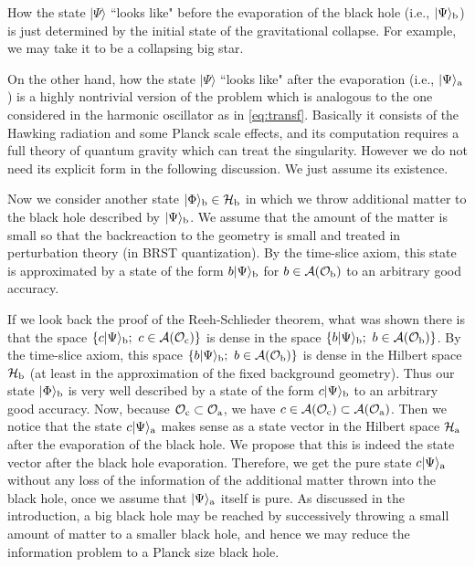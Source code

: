 \documentclass[a4paper,11pt]{article}
\theoremstyle{plain}
\theoremstyle{definition}
\numberwithin{thm}{section}
\newcommand{\ket}[1]{ | {#1} \rangle }
\def\CA{{\cal A}}
\def\CH{{\cal H}}
\def\CO{{\cal O}}
\begin{document}
How the state $\ket{\Psi}$ ``looks like" before the evaporation of the black hole (i.e., $\ket{\Psi}_{\rm b}$) is just determined by the initial state of the gravitational collapse. For example, 
we may take it to be a collapsing big star.

On the other hand, how the state $\ket{\Psi}$ ``looks like" after the evaporation (i.e., $\ket{\Psi}_{\rm a}$) is a highly nontrivial version of the problem which is
analogous to the one considered in the harmonic oscillator 
as in \eqref{eq:transf}. Basically it consists of the Hawking radiation and some Planck scale effects, and its computation requires a full theory of quantum gravity which can treat the singularity.
However we do not need its explicit form in the following discussion. We just assume its existence. 


Now we consider another state $\ket{\Phi}_{\rm b} \in \CH_{\rm b}$ in which we throw additional matter to the black hole described by $\ket{\Psi}_{\rm b}$.
We assume that the amount of the matter is small so that the backreaction to the geometry is small and treated in perturbation theory (in BRST quantization).
By the time-slice axiom, this state is approximated by a state of the form  $ b\ket{\Psi}_{\rm b}$ for $b \in \CA(\CO_{\rm b})$ to an arbitrary good accuracy. 

If we look back the proof of the Reeh-Schlieder theorem, what was shown there is that
the space $\{  c\ket{\Psi}_{\rm b};\  c \in \CA(\CO_{\rm c}) \}$ is dense in the space $\{  b\ket{\Psi}_{\rm b};\ b \in \CA(\CO_{\rm b}) \}$.
By the time-slice axiom, this space $\{  b\ket{\Psi}_{\rm b};\ b \in \CA(\CO_{\rm b}) \}$ is dense in the Hilbert space $\CH_{\rm b}$
(at least in the approximation of the fixed background geometry).
Thus our state $\ket{\Phi}_{\rm b}$ is very well described by a state of the form $c \ket{\Psi}_{\rm b}$ to an arbitrary good accuracy.
Now, because $\CO_{\rm c} \subset \CO_{\rm a}$, we have $c \in \CA(\CO_{\rm c}) \subset \CA(\CO_{\rm a}) $.
Then we notice that the state $c \ket{\Psi}_{\rm a}$ makes sense as a state vector in the Hilbert space $\CH_{\rm a}$ after the evaporation of the black hole.
We propose that this is indeed the state vector after the black hole evaporation.
Therefore, we get the pure state $c \ket{\Psi}_{\rm a}$ without any loss of the information of the additional matter thrown into the black hole,
once we assume that $\ket{\Psi}_{\rm a}$ itself is pure. As discussed in the introduction, a big black hole may be reached by successively throwing a small amount of matter to a smaller black hole,
and hence we may reduce the information problem to a Planck size black hole.
\end{document}
